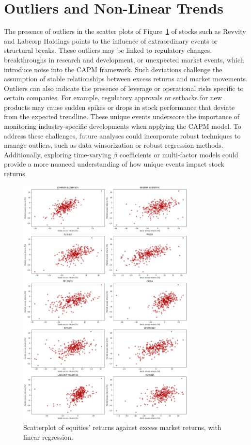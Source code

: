 \section{Outliers and Non-Linear Trends}
The presence of outliers in the scatter plots of Figure~\ref{fig:gigascatter} of stocks such as Revvity and Labcorp Holdings points to the influence of 
extraordinary events or structural breaks. 
These outliers may be linked to regulatory changes, breakthroughs in research and development, or unexpected market events, 
which introduce noise into the CAPM framework.
Such deviations challenge the assumption of stable relationships between excess returns and market movements.
Outliers can also indicate the presence of leverage or operational risks specific to certain companies. For example, regulatory
approvals or setbacks for new products may cause sudden spikes or drops in stock performance that deviate from the expected 
trendline. 
These unique events underscore the importance of monitoring industry-specific developments when applying the CAPM model.
To address these challenges, future analyses could incorporate robust techniques to manage outliers, such as data 
winsorization or robust regression methods. 
Additionally, exploring time-varying $\beta$ coefficients or multi-factor models could provide a more nuanced understanding of
how unique events impact stock returns.
\begin{figure}[H]
    \centering
    \includegraphics[width=0.8\textwidth]{images/equities_scatterplot.png}
    \caption{Scatterplot of equities' returns against excess market returns, with linear regression.}\label{fig:gigascatter}
\end{figure}